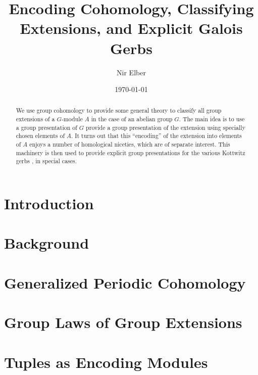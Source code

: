 \documentclass{article}
\title{Encoding Cohomology, Classifying Extensions, and Explicit Galois Gerbs}
\author{Nir Elber}
\date{\today}
\numberwithin{equation}{section}
\begin{document}
\maketitle

\begin{abstract}
	\noindent We use group cohomology to provide some general theory to classify all group extensions of a $ G$-module $A$ in the case of an abelian group $ G$. The main idea is to use a group presentation of $G$ provide a group presentation of the extension using specially chosen elements of $A$. It turns out that this ``encoding'' of the extension into elements of $A$ enjoys a number of homological niceties, which are of separate interest. This machinery is then used to provide explicit group presentations for the various Kottwitz gerbs \cite{kottwitz}, in special cases.
\end{abstract}

\setcounter{tocdepth}{4}
\tableofcontents

\section{Introduction} \label{sec:intro}


\section{Background} \label{sec:background}


\section{Generalized Periodic Cohomology} \label{sec:crackpot}


\section{Group Laws of Group Extensions} \label{sec:general}




\section{Tuples as Encoding Modules} \label{sec:tuplestudy}

\end{document}
